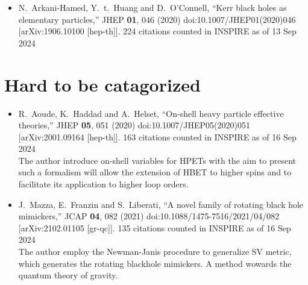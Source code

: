 \documentclass[a4paper,12pt]{article}
\title{}
\author{}
\begin{document}
    \begin{itemize}
        \item %
        N.~Arkani-Hamed, Y.~t.~Huang and D.~O'Connell,
        ``Kerr black holes as elementary particles,''
        JHEP \textbf{01}, 046 (2020)
        doi:10.1007/JHEP01(2020)046
        [arXiv:1906.10100 [hep-th]].
        224 citations counted in INSPIRE as of 13 Sep 2024
    \end{itemize}
\section*{Hard to be catagorized}
\begin{itemize}
    \item %
    R.~Aoude, K.~Haddad and A.~Helset,
    ``On-shell heavy particle effective theories,''
    JHEP \textbf{05}, 051 (2020)
    doi:10.1007/JHEP05(2020)051
    [arXiv:2001.09164 [hep-th]].
    163 citations counted in INSPIRE as of 16 Sep 2024\\
    The author introduce on-shell variables for HPETs with the aim to present such a formalism will allow the extension of
    HBET to higher spins and to facilitate its application to higher loop orders. 
    \item %
    J.~Mazza, E.~Franzin and S.~Liberati,
    ``A novel family of rotating black hole mimickers,''
    JCAP \textbf{04}, 082 (2021)
    doi:10.1088/1475-7516/2021/04/082
    [arXiv:2102.01105 [gr-qc]].
    135 citations counted in INSPIRE as of 16 Sep 2024\\
    The author employ the Newman-Janis procedure to generalize SV metric, which generates the rotating blackhole mimickers. A method wowards the quantum theory of gravity.
\end{itemize}
\end{document}
